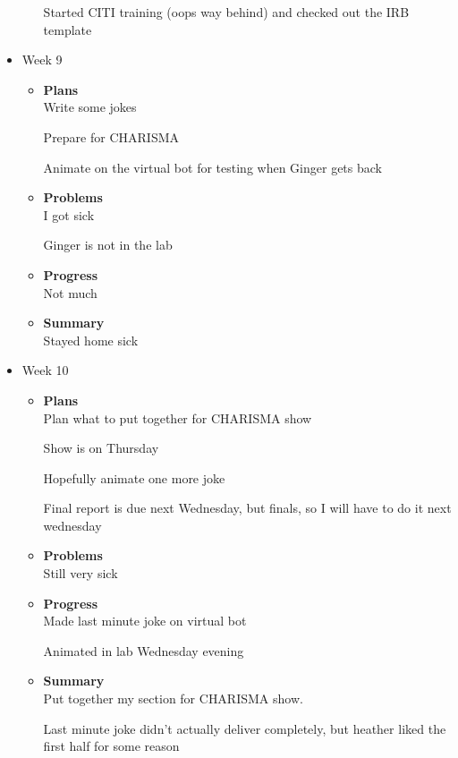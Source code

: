 \begin{itemize}
\begin{itemize}
Started CITI training (oops way behind) and checked out the IRB template
		\end{itemize}
		\item{Week 9}
		\begin{itemize}
			\item \textbf{Plans} \\
			Write some jokes

Prepare for CHARISMA

Animate on the virtual bot for testing when Ginger gets back
			\item \textbf{Problems} \\
			I got sick

			Ginger is not in the lab
			\item \textbf{Progress} \\
			Not much
			\item \textbf{Summary} \\
			Stayed home sick
		\end{itemize}
		\item{Week 10}
		\begin{itemize}
			\item \textbf{Plans} \\
			Plan what to put together for CHARISMA show

Show is on Thursday

Hopefully animate one more joke

Final report is due next Wednesday, but finals, so I will have to do it next wednesday
			\item \textbf{Problems} \\
			Still very sick
			\item \textbf{Progress} \\
			Made last minute joke on virtual bot

Animated in lab Wednesday evening
			\item \textbf{Summary} \\
			Put together my section for CHARISMA show.

Last minute joke didn't actually deliver completely, but heather liked the first half for some reason
		\end{itemize}
	\end{itemize}

